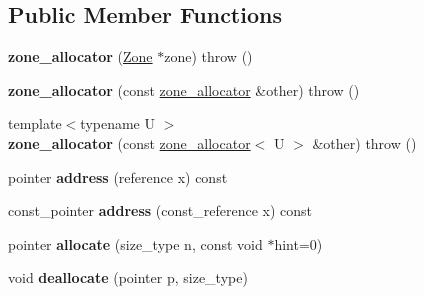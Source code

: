 \subsection*{Public Member Functions}
\begin{DoxyCompactItemize}
\item 
{\bfseries zone\+\_\+allocator} (\hyperlink{classv8_1_1internal_1_1_zone}{Zone} $\ast$zone)  throw ()\hypertarget{classv8_1_1internal_1_1zone__allocator_a78b2d8217989b0861c8acc695c5599cc}{}\label{classv8_1_1internal_1_1zone__allocator_a78b2d8217989b0861c8acc695c5599cc}

\item 
{\bfseries zone\+\_\+allocator} (const \hyperlink{classv8_1_1internal_1_1zone__allocator}{zone\+\_\+allocator} \&other)  throw ()\hypertarget{classv8_1_1internal_1_1zone__allocator_a7c14fb89509fd91fa273afd9bbe04e21}{}\label{classv8_1_1internal_1_1zone__allocator_a7c14fb89509fd91fa273afd9bbe04e21}

\item 
{\footnotesize template$<$typename U $>$ }\\{\bfseries zone\+\_\+allocator} (const \hyperlink{classv8_1_1internal_1_1zone__allocator}{zone\+\_\+allocator}$<$ U $>$ \&other)  throw ()\hypertarget{classv8_1_1internal_1_1zone__allocator_aad25da967d9ebd3a9736907d5970b473}{}\label{classv8_1_1internal_1_1zone__allocator_aad25da967d9ebd3a9736907d5970b473}

\item 
pointer {\bfseries address} (reference x) const \hypertarget{classv8_1_1internal_1_1zone__allocator_a447522d95f8ea0db3d4601b4c67a5c1f}{}\label{classv8_1_1internal_1_1zone__allocator_a447522d95f8ea0db3d4601b4c67a5c1f}

\item 
const\+\_\+pointer {\bfseries address} (const\+\_\+reference x) const \hypertarget{classv8_1_1internal_1_1zone__allocator_a32b315102b63d6dc726d8ca530ede541}{}\label{classv8_1_1internal_1_1zone__allocator_a32b315102b63d6dc726d8ca530ede541}

\item 
pointer {\bfseries allocate} (size\+\_\+type n, const void $\ast$hint=0)\hypertarget{classv8_1_1internal_1_1zone__allocator_ad3c946af3d4d514e5bf6586e7823ee97}{}\label{classv8_1_1internal_1_1zone__allocator_ad3c946af3d4d514e5bf6586e7823ee97}

\item 
void {\bfseries deallocate} (pointer p, size\+\_\+type)\hypertarget{classv8_1_1internal_1_1zone__allocator_acc31da3cfb64e71a5f7188f366800ca4}{}\label{classv8_1_1internal_1_1zone__allocator_acc31da3cfb64e71a5f7188f366800ca4}


\end{DoxyCompactItemize}
